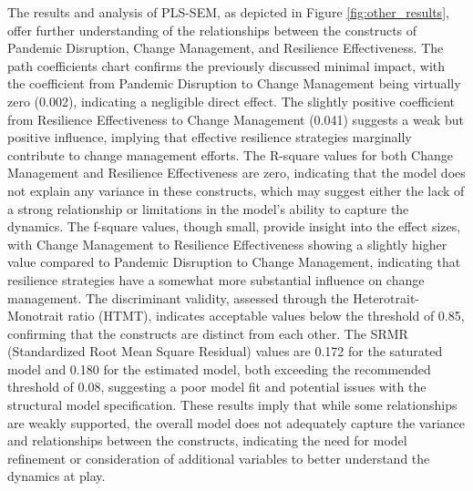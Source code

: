 The results and analysis of PLS-SEM, as depicted in Figure \ref{fig:other_results}, offer further understanding of the relationships between the constructs of Pandemic Disruption, Change Management, and Resilience Effectiveness. The path coefficients chart confirms the previously discussed minimal impact, with the coefficient from Pandemic Disruption to Change Management being virtually zero (0.002), indicating a negligible direct effect. The slightly positive coefficient from Resilience Effectiveness to Change Management (0.041) suggests a weak but positive influence, implying that effective resilience strategies marginally contribute to change management efforts. The R-square values for both Change Management and Resilience Effectiveness are zero, indicating that the model does not explain any variance in these constructs, which may suggest either the lack of a strong relationship or limitations in the model's ability to capture the dynamics. The f-square values, though small, provide insight into the effect sizes, with Change Management to Resilience Effectiveness showing a slightly higher value compared to Pandemic Disruption to Change Management, indicating that resilience strategies have a somewhat more substantial influence on change management. The discriminant validity, assessed through the Heterotrait-Monotrait ratio (HTMT), indicates acceptable values below the threshold of 0.85, confirming that the constructs are distinct from each other. The SRMR (Standardized Root Mean Square Residual) values are 0.172 for the saturated model and 0.180 for the estimated model, both exceeding the recommended threshold of 0.08, suggesting a poor model fit and potential issues with the structural model specification. These results imply that while some relationships are weakly supported, the overall model does not adequately capture the variance and relationships between the constructs, indicating the need for model refinement or consideration of additional variables to better understand the dynamics at play.

